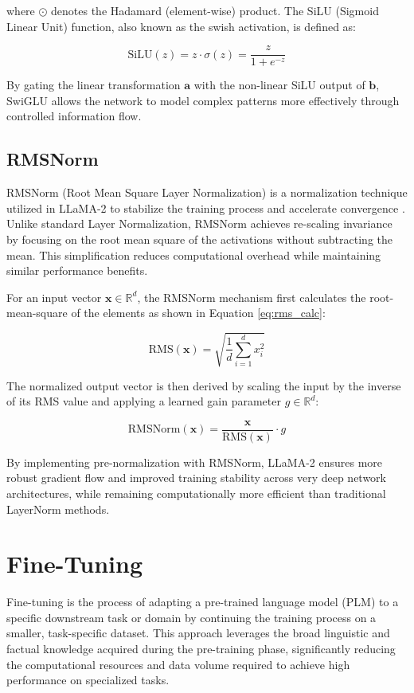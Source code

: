 where $\odot$ denotes the Hadamard (element-wise) product. The SiLU (Sigmoid Linear Unit) function, also known as the swish activation, is defined as:

\begin{equation}
\text{SiLU}(z) = z \cdot \sigma(z) = \frac{z}{1 + e^{-z}}
\end{equation}

By gating the linear transformation $\mathbf{a}$ with the non-linear SiLU output of $\mathbf{b}$, SwiGLU allows the network to model complex patterns more effectively through controlled information flow.

\subsection{RMSNorm}
RMSNorm (Root Mean Square Layer Normalization) is a normalization technique utilized in LLaMA-2 to stabilize the training process and accelerate convergence \cite{zhang2019rmsnorm}. Unlike standard Layer Normalization, RMSNorm achieves re-scaling invariance by focusing on the root mean square of the activations without subtracting the mean. This simplification reduces computational overhead while maintaining similar performance benefits.



For an input vector $\mathbf{x} \in \mathbb{R}^d$, the RMSNorm mechanism first calculates the root-mean-square of the elements as shown in Equation \ref{eq:rms_calc}:

\begin{equation}
\label{eq:rms_calc}
\text{RMS}(\mathbf{x}) = \sqrt{\frac{1}{d} \sum_{i=1}^{d} x_i^2}
\end{equation}

The normalized output vector is then derived by scaling the input by the inverse of its RMS value and applying a learned gain parameter $g \in \mathbb{R}^d$:

\begin{equation}
\text{RMSNorm}(\mathbf{x}) = \frac{\mathbf{x}}{\text{RMS}(\mathbf{x})} \cdot g
\end{equation}

By implementing pre-normalization with RMSNorm, LLaMA-2 ensures more robust gradient flow and improved training stability across very deep network architectures, while remaining computationally more efficient than traditional LayerNorm methods.


\section{Fine-Tuning}
Fine-tuning is the process of adapting a pre-trained language model (PLM) to a specific downstream task or domain by continuing the training process on a smaller, task-specific dataset. This approach leverages the broad linguistic and factual knowledge acquired during the pre-training phase, significantly reducing the computational resources and data volume required to achieve high performance on specialized tasks.

